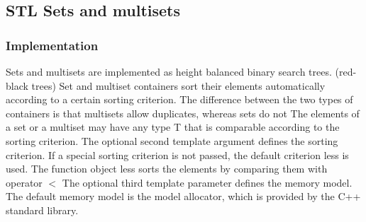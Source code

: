 \documentclass{report}
\begin{document}
   \pagebreak 
   \subsection{STL Sets and multisets}
   \bigbreak \noindent 
   \subsubsection{Implementation}
   \bigbreak \noindent \bigbreak \noindent 
   Sets and multisets are implemented as height balanced binary search trees. (red-black trees)
   \bigbreak \noindent 
   Set and multiset containers sort their elements automatically according to a certain sorting criterion. The difference between the two types of containers is that multisets allow duplicates, whereas sets do not
   \bigbreak \noindent 
   The elements of a set or a multiset may have any type T that is comparable according to the sorting criterion. The optional second template argument defines the sorting criterion. If a special sorting criterion is not passed, the default criterion less is used. The function object less sorts the elements by comparing them with operator $<$
   \bigbreak \noindent 
   The optional third template parameter defines the memory model. The default memory model is the model allocator, which is provided by the C++ standard library.
   \bigbreak \noindent 
\end{document}
